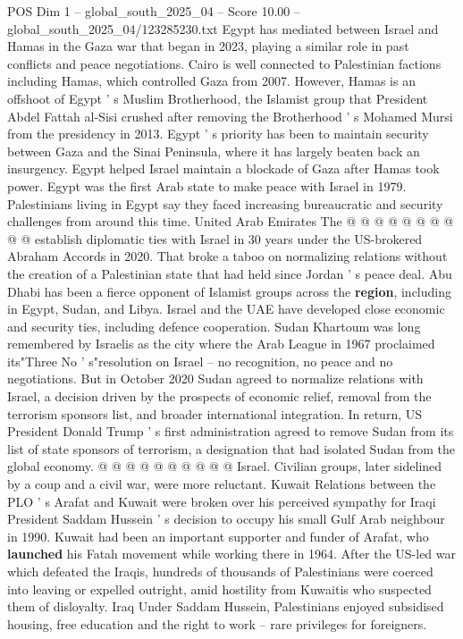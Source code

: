 \begin{textsample}{POS Dim 1 – global\_south\_2025\_04 – Score 10.00 – global\_south\_2025\_04/123285230.txt}
Egypt has mediated between Israel and Hamas in the Gaza war that began in 2023, playing a similar role in past conflicts and peace negotiations.
Cairo is well connected to Palestinian factions including Hamas, which controlled Gaza from 2007.
However, Hamas is an offshoot of Egypt ' s Muslim Brotherhood, the Islamist group that President Abdel Fattah al-Sisi crushed after removing the Brotherhood ' s Mohamed Mursi from the presidency in 2013.
Egypt ' s priority has been to maintain security between Gaza and the Sinai Peninsula, where it has largely beaten back an insurgency.
Egypt helped Israel maintain a blockade of Gaza after Hamas took power.
Egypt was the first Arab state to make peace with Israel in 1979.
Palestinians living in Egypt say they faced increasing bureaucratic and security challenges from around this time.
United Arab Emirates The @ @ @ @ @ @ @ @ @ @ establish diplomatic ties with Israel in 30 years under the US-brokered Abraham Accords in 2020.
That broke a taboo on normalizing relations without the creation of a Palestinian state that had held since Jordan ' s peace deal.
Abu Dhabi has been a fierce opponent of Islamist groups across the \textbf{region}, including in Egypt, Sudan, and Libya.
Israel and the UAE have developed close economic and security ties, including defence cooperation.
Sudan Khartoum was long remembered by Israelis as the city where the Arab League in 1967 proclaimed its"Three No ' s"resolution on Israel -- no recognition, no peace and no negotiations.
But in October 2020 Sudan agreed to normalize relations with Israel, a decision driven by the prospects of economic relief, removal from the terrorism sponsors list, and broader international integration.
In return, US President Donald Trump ' s first administration agreed to remove Sudan from its list of state sponsors of terrorism, a designation that had isolated Sudan from the global economy. @ @ @ @ @ @ @ @ @ @ Israel.
Civilian groups, later sidelined by a coup and a civil war, were more reluctant.
Kuwait Relations between the PLO ' s Arafat and Kuwait were broken over his perceived sympathy for Iraqi President Saddam Hussein ' s decision to occupy his small Gulf Arab neighbour in 1990.
Kuwait had been an important supporter and funder of Arafat, who \textbf{launched} his Fatah movement while working there in 1964.
After the US-led war which defeated the Iraqis, hundreds of thousands of Palestinians were coerced into leaving or expelled outright, amid hostility from Kuwaitis who suspected them of disloyalty.
Iraq Under Saddam Hussein, Palestinians enjoyed subsidised housing, free education and the right to work -- rare privileges for foreigners.

\end{textsample}
